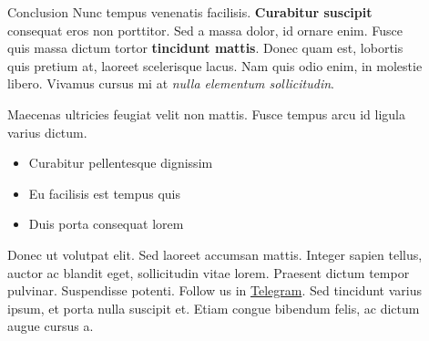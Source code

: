 \documentclass[]{beamer}
\begin{document}
\begin{frame}[t]
\begin{columns}[t]
\begin{column}{\twocolwid}
\begin{columns}[t,totalwidth=\twocolwid]
\begin{column}{\onecolwid}
    
    \end{column} %
    
    \end{columns} %
    
    \end{column} %
    
    \begin{column}{\sepwid}\end{column} %
    
    \begin{column}{\onecolwid} %
    
    
    \begin{block}{Conclusion}
    Nunc tempus venenatis facilisis. \textbf{Curabitur suscipit} consequat eros non porttitor. Sed a massa dolor, id ornare enim. Fusce quis massa dictum tortor \textbf{tincidunt mattis}. Donec quam est, lobortis quis pretium at, laoreet scelerisque lacus. Nam quis odio enim, in molestie libero. Vivamus cursus mi at \textit{nulla elementum sollicitudin}.

    Maecenas ultricies feugiat velit non mattis. Fusce tempus arcu id ligula varius dictum. 
    \begin{itemize}
    \item Curabitur pellentesque dignissim
    \item Eu facilisis est tempus quis
    \item Duis porta consequat lorem
    \end{itemize}
    
    Donec ut volutpat elit. Sed laoreet accumsan mattis. Integer sapien tellus, auctor ac blandit eget, sollicitudin vitae lorem. Praesent dictum tempor pulvinar. Suspendisse potenti. Follow us in \href{https://t.me/vega_institute}{Telegram}. Sed tincidunt varius ipsum, et porta nulla suscipit et. Etiam congue bibendum felis, ac dictum augue cursus a.
    
    \end{block}
    
    

\end{column}
\end{columns}
\end{frame}
\end{document}
